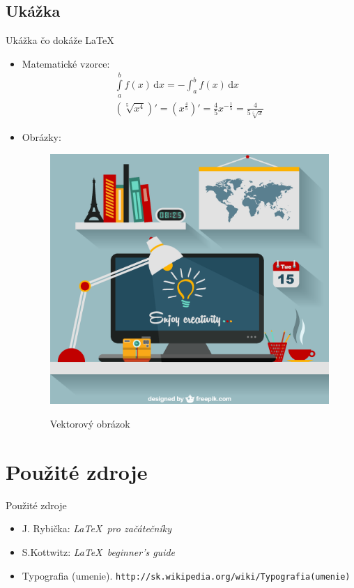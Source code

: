 \documentclass{beamer}
\begin{document}
\subsection{Ukážka}

\begin{frame}{Ukážka čo dokáže \LaTeX}
\begin{itemize}
\item Matematické vzorce:
\begin{align}
	\int\limits_a^b f(x)\,\mathrm{d}x = -\int_a^b f(x)\,\mathrm{d}x \\
    \left(\sqrt[5]{x^4}\right)'=\left(x^{\frac{4}{5}}\right)'= \frac{4}{5} x^{-\frac{1}{5}} = \frac{4}{5\sqrt[5]{x}}
\label{eq:math}
\end{align}

\item Obrázky:
\begin{figure}[ht]
\begin{center}
\scalebox{0.1}
{\includegraphics{image.eps}}
\caption{Vektorový obrázok}
\label{fig:Vect}
\end{center}
\end{figure}

\end{itemize}


\end{frame}

\section{Použité zdroje}
\begin{frame}{Použité zdroje}
\begin{itemize}
\item J. Rybička: \emph{ \LaTeX\ pro začátečníky}
\item S.Kottwitz: \emph{\LaTeX\ beginner's guide}
\item Typografia (umenie). \texttt{http://sk.wikipedia.org/wiki/Typografia(umenie)} %
\end{itemize}
\end{frame}
\end{document}
